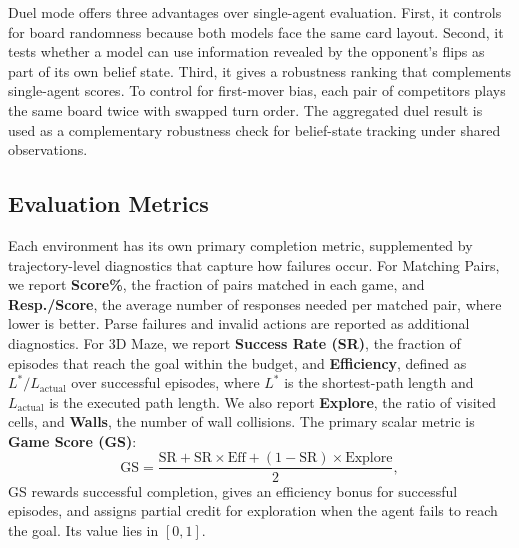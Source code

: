 Duel mode offers three advantages over single-agent evaluation. First, it controls for board randomness because both models face the same card layout. Second, it tests whether a model can use information revealed by the opponent's flips as part of its own belief state. Third, it gives a robustness ranking that complements single-agent scores. To control for first-mover bias, each pair of competitors plays the same board twice with swapped turn order. The aggregated duel result is used as a complementary robustness check for belief-state tracking under shared observations.

\subsection{Evaluation Metrics}
\label{sec:metrics}


Each environment has its own primary completion metric, supplemented by trajectory-level diagnostics that capture how failures occur. 
For Matching Pairs, we report \textbf{Score\%}, the fraction of pairs matched in each game, and \textbf{Resp./Score}, the average number of responses needed per matched pair, where lower is better. Parse failures and invalid actions are reported as additional diagnostics.
For 3D Maze, we report \textbf{Success Rate (SR)}, the fraction of episodes that reach the goal within the budget, and \textbf{Efficiency}, defined as $L^*/L_{\text{actual}}$ over successful episodes, where $L^*$ is the shortest-path length and $L_{\text{actual}}$ is the executed path length. We also report \textbf{Explore}, the ratio of visited cells, and \textbf{Walls}, the number of wall collisions. The primary scalar metric is \textbf{Game Score (GS)}:
\begin{equation}
\label{eq:game_score}
\text{GS} = \frac{\text{SR} + \text{SR}{\times}\text{Eff} + (1{-}\text{SR}){\times}\text{Explore}}{2},
\end{equation}
GS rewards successful completion, gives an efficiency bonus for successful episodes, and assigns partial credit for exploration when the agent fails to reach the goal. Its value lies in $[0,1]$.



